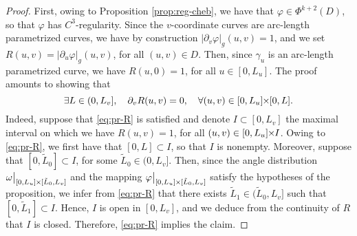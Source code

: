 \documentclass{article}
\newcommand{\PLH}{{\mkern-1mu\times\mkern-1mu}}
\newcommand{\Times}{\PLH}
\theoremstyle{remark}
\theoremstyle{prpart}
\newcommand{\PU}{\partial_{u}\varphi}
\newcommand{\PV}{\partial_{v}\varphi}
\begin{document}
\begin{proof}
  First, owing to Proposition \ref{prop:reg-cheb}, we have that $\varphi\in \Phi^{k+2}(D)$, so that $\varphi$ has $C^3$-regularity.
  Since the $v$-coordinate curves are arc-length parametrized curves, we have by construction $|\PV|_g(u,v) = 1$, and we set $R(u,v) = |\PU|_g(u,v)$, for all $(u,v)\in D$. Then, since $\gamma_u$ is an arc-length parametrized curve, we have $R(u,0) = 1$, for all $u\in [0,L_u]$. The proof amounts to showing that
\begin{equation}
\label{eq:pr-R}
 \exists L\in(0,L_v],\quad \partial_v R(u,v) = 0, \quad\forall (u,v)\in [0,L_u]\Times[0,L].
\end{equation}
Indeed, suppose that \eqref{eq:pr-R} is satisfied and denote $I\subset [0,L_v]$ the maximal interval on which we have $R(u,v) = 1$, for all $(u,v)\in [0,L_u]\Times I$. Owing to \eqref{eq:pr-R}, we first have that $[0,L]\subset I$, so that $I$ is nonempty. Moreover, suppose that $[0,\tilde L_0]\subset I$, for some $\tilde L_0\in(0,L_v]$. Then, since the angle distribution $\omega\big|_{[0,L_u]\Times[\tilde L_0,L_v]}$ and the mapping $\varphi\big|_{[0,L_u]\Times[\tilde L_0,L_v]}$ satisfy the hypotheses of the proposition, we infer from \eqref{eq:pr-R} that there exists $\tilde L_1\in(\tilde L_0,L_v]$ such that $[0,\tilde L_1]\subset I$. Hence, $I$ is open in $[0,L_v]$, and we deduce from the continuity of $R$ that $I$ is closed. Therefore, \eqref{eq:pr-R} implies the claim.


\end{proof}
\end{document}
